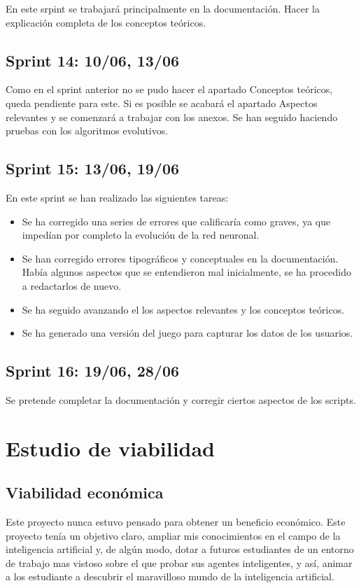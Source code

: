 En este srpint se trabajará principalmente en la documentación. Hacer la explicación completa de los conceptos teóricos.


\subsection{Sprint 14:  10/06, 13/06}

Como en el sprint anterior no se pudo hacer el apartado Conceptos teóricos, queda pendiente para este. Si es posible se acabará el apartado Aspectos relevantes y se comenzará a trabajar con los anexos. Se han seguido haciendo pruebas con los algoritmos evolutivos.

\subsection{Sprint 15:  13/06, 19/06}

En este sprint se han realizado las siguientes tareas: 
\begin{itemize}
    \item Se ha corregido una series de errores que calificaría como graves, ya que impedían por completo la evolución de la red neuronal.
    \item Se han corregido errores tipográficos y conceptuales en la documentación. Había algunos aspectos que se entendieron mal inicialmente, se ha procedido a redactarlos de nuevo.
    \item Se ha seguido avanzando el los aspectos relevantes y los conceptos teóricos.
    \item Se ha generado una versión del juego para capturar los datos de los usuarios.
\end{itemize}

\subsection{Sprint 16:  19/06, 28/06}

Se pretende completar la documentación y corregir ciertos aspectos de los scripts.

\section{Estudio de viabilidad}

\subsection{Viabilidad económica}
Este proyecto nunca estuvo pensado para obtener un beneficio económico. Este proyecto tenía un objetivo claro, ampliar mis conocimientos en el campo de la inteligencia artificial y, de algún modo, dotar a futuros estudiantes de un entorno de trabajo mas vistoso sobre el que probar sus agentes inteligentes, y así, animar a los estudiante a descubrir el maravilloso mundo de la inteligencia artificial.

